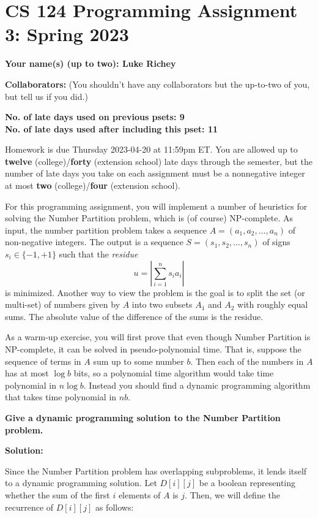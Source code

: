 \documentclass[11pt]{article}
\begin{document}
	
	\section*{CS 124 Programming Assignment 3: Spring 2023}
 		
	\textbf{Your name(s) (up to two): Luke Richey} 
		
	\textbf{Collaborators:} (You shouldn't have any collaborators but the up-to-two of you, but tell us if you did.)

	\textbf{No. of late days used on previous psets: 9}\\
	\textbf{No. of late days used after including this pset: 11}

Homework is due Thursday 2023-04-20 at 11:59pm ET. You are allowed up to {\bf twelve} (college)/{\bf forty} (extension school) late days through the semester, but the number of late days you take on each assignment must be a nonnegative integer at most {\bf two} (college)/{\bf four} (extension school).

For this programming assignment, you will implement a number of
heuristics for solving the {\sc Number Partition} problem, which is
(of course) NP-complete.  As input, the number partition problem
takes a sequence $A = (a_1,a_2,\ldots,a_n)$ of non-negative integers.  The output is a sequence $S = (s_1,s_2,\ldots,s_n)$ 
of signs $s_i \in \{-1,+1\}$ such that the {\em residue}
$$u = \left | \sum_{i=1}^n s_i a_i \right |$$ is minimized.  Another
way to view the problem is the goal is to split the set (or multi-set)
of numbers given by $A$ into two subsets $A_1$ and $A_2$ with roughly
equal sums.  The absolute value of the difference of the sums is the
residue.

As a warm-up exercise, you will first prove that even though Number
Partition is NP-complete, it can be solved in pseudo-polynomial time.
That is, suppose the sequence of terms in $A$ sum up to some number
$b$.  Then each of the numbers in $A$ has at most $\log b$ bits,
so a polynomial time algorithm would take time polynomial in 
$n \log b$.  Instead you should find a dynamic programming algorithm
that takes time polynomial in $nb$.  

\smallskip 
{\bf Give a dynamic programming solution to the Number Partition
problem.}

\textbf{Solution: }

Since the Number Partition problem has overlapping subproblems, it lends itself 
to a dynamic programming solution. Let $D[i][j]$ be a boolean representing 
whether the sum of the first $i$ elements of $A$ is $j$. Then, we will define 
the recurrence of $D[i][j]$ as follows:
\end{document}
